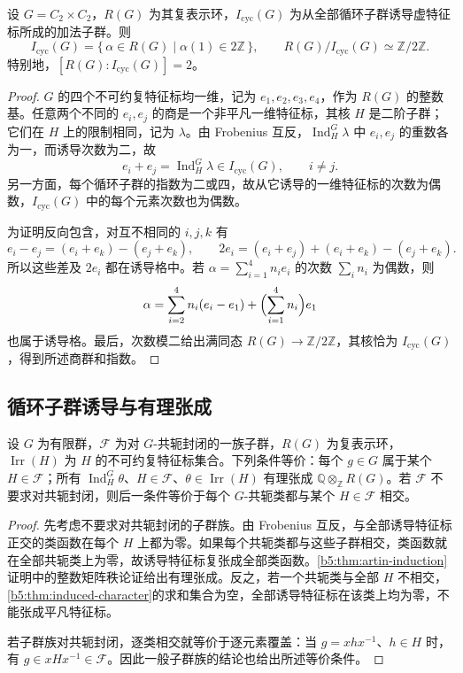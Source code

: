 \begin{proposition}\label{b5:prop:klein-cyclic-induction-index}
	设 \(G=C_2\times C_2\)，\(R(G)\) 为其复表示环，\(I_{\mathrm{cyc}}(G)\) 为从全部循环子群诱导虚特征标所成的加法子群。则
	\[
		I_{\mathrm{cyc}}(G)=\{\,\alpha\in R(G)\mid\alpha(1)\in2\mathbb Z\,\}, \qquad R(G)/I_{\mathrm{cyc}}(G)\simeq\mathbb Z/2\mathbb Z.
	\]
	特别地，\([R(G):I_{\mathrm{cyc}}(G)]=2\)。
\end{proposition}
\begin{proof}
	\(G\) 的四个不可约复特征标均一维，记为 \(e_1,e_2,e_3,e_4\)，作为 \(R(G)\) 的整数基。任意两个不同的 \(e_i,e_j\) 的商是一个非平凡一维特征标，其核 \(H\) 是二阶子群；它们在 \(H\) 上的限制相同，记为 \(\lambda\)。由 Frobenius 互反，\(\operatorname{Ind}_H^G\lambda\) 中 \(e_i,e_j\) 的重数各为一，而诱导次数为二，故
	\[
		e_i+e_j=\operatorname{Ind}_H^G\lambda\in I_{\mathrm{cyc}}(G),\qquad i\ne j.
	\]
	另一方面，每个循环子群的指数为二或四，故从它诱导的一维特征标的次数为偶数，\(I_{\mathrm{cyc}}(G)\) 中的每个元素次数也为偶数。

	为证明反向包含，对互不相同的 \(i,j,k\) 有
	\[
		e_i-e_j=(e_i+e_k)-(e_j+e_k),\qquad 2e_i=(e_i+e_j)+(e_i+e_k)-(e_j+e_k).
	\]
	所以这些差及 \(2e_i\) 都在诱导格中。若 \(\alpha=\sum_{i=1}^4n_ie_i\) 的次数 \(\sum_i n_i\) 为偶数，则
	\[
		\alpha=\sum_{i=2}^4n_i(e_i-e_1)+\Bigl(\sum_{i=1}^4n_i\Bigr)e_1
	\]
	也属于诱导格。最后，次数模二给出满同态 \(R(G)\to\mathbb Z/2\mathbb Z\)，其核恰为 \(I_{\mathrm{cyc}}(G)\)，得到所述商群和指数。
\end{proof}

\subsection{循环子群诱导与有理张成}
\label{b5:subsec:0502:03}

\begin{proposition}\label{b5:prop:subgroup-cover-induction}
	设 \(G\) 为有限群，\(\mathcal F\) 为对 \(G\)-共轭封闭的一族子群，\(R(G)\) 为复表示环，\(\operatorname{Irr}(H)\) 为 \(H\) 的不可约复特征标集合。下列条件等价：每个 \(g\in G\) 属于某个 \(H\in\mathcal F\)；所有 \(\operatorname{Ind}_H^G\theta\)、\(H\in\mathcal F\)、\(\theta\in\operatorname{Irr}(H)\) 有理张成 \(\mathbb Q\otimes_{\mathbb Z}R(G)\)。若 \(\mathcal F\) 不要求对共轭封闭，则后一条件等价于每个 \(G\)-共轭类都与某个 \(H\in\mathcal F\) 相交。
\end{proposition}
\begin{proof}
	先考虑不要求对共轭封闭的子群族。由 Frobenius 互反，与全部诱导特征标正交的类函数在每个 \(H\) 上都为零。如果每个共轭类都与这些子群相交，类函数就在全部共轭类上为零，故诱导特征标复张成全部类函数。\cref{b5:thm:artin-induction}证明中的整数矩阵秩论证给出有理张成。反之，若一个共轭类与全部 \(H\) 不相交，\cref{b5:thm:induced-character}的求和集合为空，全部诱导特征标在该类上均为零，不能张成平凡特征标。

	若子群族对共轭封闭，逐类相交就等价于逐元素覆盖：当 \(g=xhx^{-1}\)、\(h\in H\) 时，有 \(g\in xHx^{-1}\in\mathcal F\)。因此一般子群族的结论也给出所述等价条件。
\end{proof}


